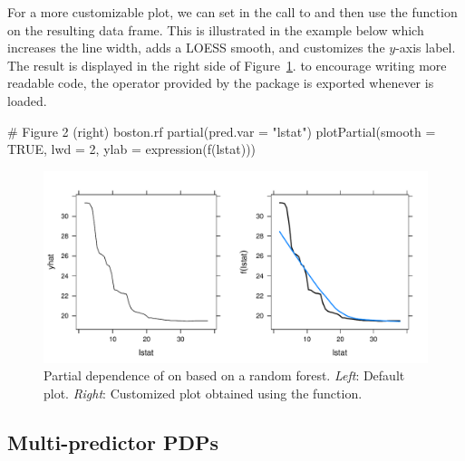 For a more customizable plot, we can set  in the call to  and then use the  function on the resulting data frame. This is illustrated in the example below which increases the line width, adds a LOESS smooth, and customizes the $y$-axis label. The result is displayed in the right side of Figure~\ref{fig:pd_lstat}.  to encourage writing more readable code, the  operator \code{\%>\%} provided by the  package \citep{magrittr-pkg} is exported whenever  is loaded.
\begin{example}
# Figure 2 (right)
boston.rf %
  partial(pred.var = "lstat") %
  plotPartial(smooth = TRUE, lwd = 2, ylab = expression(f(lstat)))
\end{example}

\begin{figure}[!htbp]
  \centering
  \includegraphics[width=1.0\linewidth]{pd_lstat}
  \caption{Partial dependence of  on  based on a random forest. \textit{Left}: Default plot. \textit{Right}: Customized plot obtained using the  function.}
  \label{fig:pd_lstat}
\end{figure}


\subsection{Multi-predictor PDPs}

